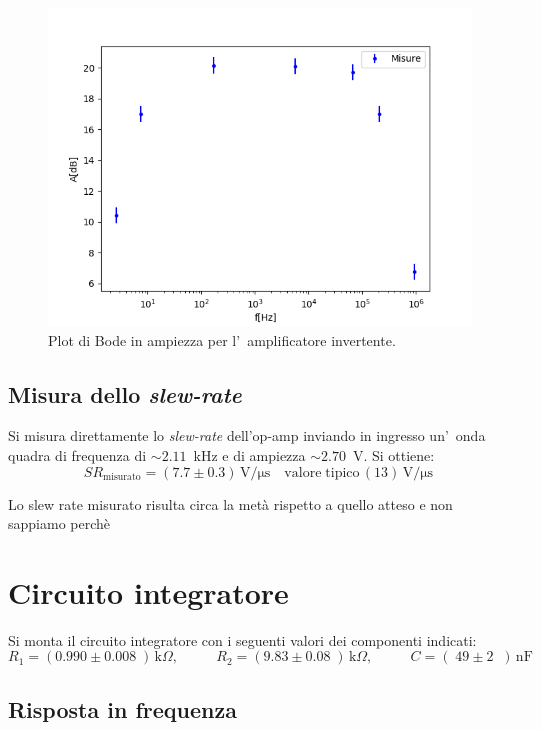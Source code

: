\documentclass[10pt,a4paper]{article}
\newcommand{\exn}{\phantom{xxx}}
\begin{document}
\begin{figure}[h]
\begin{center}
\includegraphics[width=0.7\linewidth]{2a.png}
\caption{\small Plot di Bode in ampiezza per l'~amplificatore invertente.}
\label{fig:bodeinv}
\end{center}
\end{figure}
%
\subsection{Misura dello \emph{slew-rate}}
Si misura direttamente lo \emph{slew-rate} dell'op-amp inviando in ingresso un'~onda quadra 
di frequenza di $\sim 2.11$~kHz e di ampiezza $\sim 2.70$~V. Si ottiene:
\[
SR_\mathrm{misurato} = (7.7 \pm 0.3 )\,\mathrm{V/\mu s} \quad \mathrm{valore \; tipico}\, (13 )\,\mathrm{V/\mu s}\
\]

Lo slew rate misurato risulta circa la metà rispetto a quello atteso e non sappiamo perchè%
\section{Circuito integratore}
Si monta il circuito integratore con i seguenti valori  dei componenti indicati: 
\[
R_1 = (0.990 \pm  0.008\;) \,\mathrm{k}\Omega, \:\:\;\:\exn 
R_2 = (9.83 \pm 0.08 \;) \,\mathrm{k}\Omega, \:\:\;\:\exn 
C = (\;49 \pm 2 \;\;)\,\mathrm{nF}
\]

\subsection{Risposta in frequenza}
\end{document}
